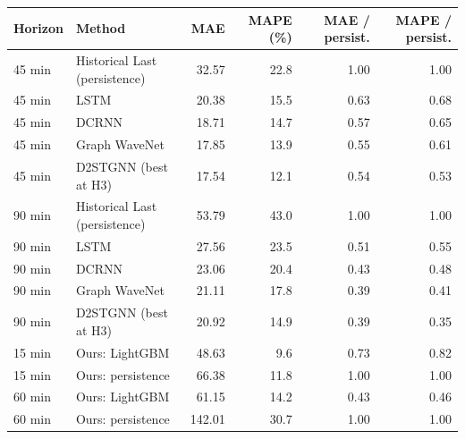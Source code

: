 \begin{tabular}{llrrrr}
\toprule
Horizon & Method & MAE & MAPE (\%) & MAE / persist. & MAPE / persist. \\
\midrule
45 min & Historical Last (persistence) & 32.57 & 22.8 & 1.00 & 1.00 \\
45 min & LSTM & 20.38 & 15.5 & 0.63 & 0.68 \\
45 min & DCRNN & 18.71 & 14.7 & 0.57 & 0.65 \\
45 min & Graph WaveNet & 17.85 & 13.9 & 0.55 & 0.61 \\
45 min & D2STGNN (best at H3) & 17.54 & 12.1 & 0.54 & 0.53 \\
90 min & Historical Last (persistence) & 53.79 & 43.0 & 1.00 & 1.00 \\
90 min & LSTM & 27.56 & 23.5 & 0.51 & 0.55 \\
90 min & DCRNN & 23.06 & 20.4 & 0.43 & 0.48 \\
90 min & Graph WaveNet & 21.11 & 17.8 & 0.39 & 0.41 \\
90 min & D2STGNN (best at H3) & 20.92 & 14.9 & 0.39 & 0.35 \\
15 min & Ours: LightGBM & 48.63 & 9.6 & 0.73 & 0.82 \\
15 min & Ours: persistence & 66.38 & 11.8 & 1.00 & 1.00 \\
60 min & Ours: LightGBM & 61.15 & 14.2 & 0.43 & 0.46 \\
60 min & Ours: persistence & 142.01 & 30.7 & 1.00 & 1.00 \\
\bottomrule
\end{tabular}
